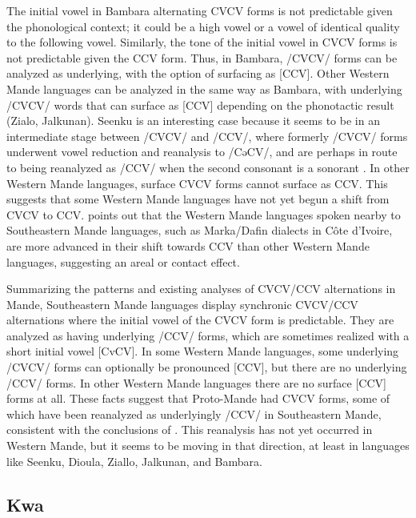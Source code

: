 \documentclass[output=paper,colorlinks,citecolor=brown]{langscibook}
\begin{document}
\newpage
The initial vowel in Bambara alternating CVCV forms is not predictable given the phonological context; it could be a high vowel or a vowel of identical quality to the following vowel. Similarly, the tone of the initial vowel in CVCV forms is not predictable given the CCV form. Thus, in Bambara, /CVCV/ forms can be analyzed as underlying, with the option of surfacing as [CCV]. Other Western Mande languages can be analyzed in the same way as Bambara, with underlying /CVCV/ words that can surface as [CCV] depending on the phonotactic result (Zialo, Jalkunan). Seenku is an interesting case because it seems to be in an intermediate stage between /CVCV/ and /CCV/, where formerly /CVCV/ forms underwent vowel reduction and reanalysis to /CəCV/, and are perhaps in route to being reanalyzed as /CCV/ when the second consonant is a sonorant \citep{McPherson:2020}. In other Western Mande languages, surface CVCV forms cannot surface as CCV. This suggests that some Western Mande languages have not yet begun a shift from CVCV to CCV. \citet{Vydrine:2004} points out that the Western Mande languages spoken nearby to Southeastern Mande languages, such as Marka/Dafin dialects in Côte d'Ivoire, are more advanced in their shift towards CCV than other Western Mande languages, suggesting an areal or contact effect.

\largerpage[-1]
Summarizing the patterns and existing analyses of CVCV\slash CCV alternations in Mande, Southeastern Mande languages display synchronic CVCV\slash CCV alternations where the initial vowel of the CVCV form is predictable. They are analyzed as having underlying /CCV/ forms, which are sometimes realized with a short initial vowel [CvCV]. In some Western Mande languages, some underlying /CVCV/ forms can optionally be pronounced [CCV], but there are no underlying /CCV/ forms. In other Western Mande languages there are no surface [CCV] forms at all. These facts suggest that Proto-Mande had CVCV forms, some of which have been reanalyzed as underlyingly /CCV/ in Southeastern Mande, consistent with the conclusions of \citet{Vydrine:2004}. This reanalysis has not yet occurred in Western Mande, but it seems to be moving in that direction, at least in languages like Seenku, Dioula, Ziallo, Jalkunan, and Bambara.

\subsection{Kwa}\label{sec:kwa}
\end{document}
